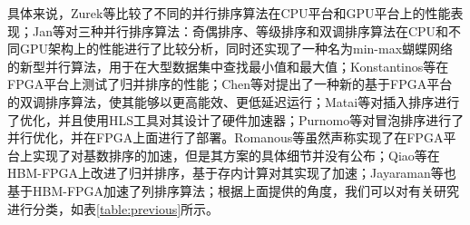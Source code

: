 具体来说，Zurek等\cite{zurek2013comparison}比较了不同的并行排序算法在CPU平台和GPU平台上的性能表现；Jan等\cite{jan2012fast}对三种并行排序算法：奇偶排序、等级排序和双调排序算法在CPU和不同GPU架构上的性能进行了比较分析，同时还实现了一种名为min-max蝴蝶网络的新型并行算法，用于在大型数据集中查找最小值和最大值；Konstantinos等\cite{georgopoulos2016evaluation}在FPGA平台上测试了归并排序的性能；Chen等\cite{chen2015energy}对提出了一种新的基于FPGA平台的双调排序算法，使其能够以更高能效、更低延迟运行；Matai等\cite{matai2016resolve}对插入排序进行了优化，并且使用HLS工具对其设计了硬件加速器；Purnomo等\cite{purnomo2016implementation}对冒泡排序进行了并行优化，并在FPGA上面进行了部署。Romanous等\cite{romanous2020high}虽然声称实现了在FPGA平台上实现了对基数排序的加速，但是其方案的具体细节并没有公布；Qiao等\cite{qiao2022topsort}在HBM-FPGA上改进了归并排序，基于存内计算对其实现了加速；Jayaraman等\cite{jayaraman2022hypersort}也基于HBM-FPGA加速了列排序算法；根据上面提供的角度，我们可以对有关研究进行分类，如表\ref{table:previous}所示。
\begin{table}[htbp]
\centering
\caption{相关工作总结}
\label{table:previous}
\end{table}

